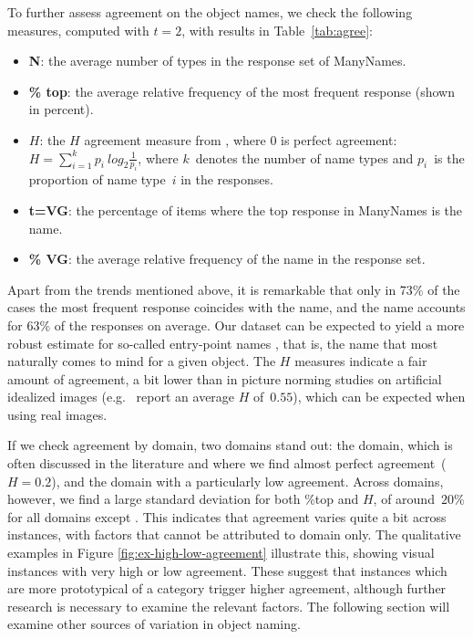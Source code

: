 To further assess agreement on the object names, we check the following measures, computed with $t=2$, with results in Table~\ref{tab:agree}:
\begin{itemize}
\item \textbf{N}: the average number of types in the response set of ManyNames.
\item \textbf{\% top}: the average relative frequency of the most frequent response (shown in percent).
\item \textbf{$H$}: the $H$ agreement measure from \cite{snodgrass}, where 0 is perfect agreement: \mbox{$H = \sum_{i=1}^k p_i~log_2\frac{1}{p_i}$}, 
where $k$\ denotes the number of name types and $p_i$\ is the proportion of name type\ $i$ in the responses. 
\item \textbf{t=VG}: the percentage of items where the top response in ManyNames is the \vg name.
\item \textbf{\% VG}: the average relative frequency of the \vg name in the response set.
\end{itemize}

Apart from the trends mentioned above, it is remarkable that only in 73\% of the cases the most frequent response coincides with the \vg name, and the \vg name accounts for 63\% of the responses on average.
Our dataset can be expected to yield a more robust estimate for so-called entry-point names \cite{jolicoeur1984pictures}, that is, the name that most naturally comes to mind for a given object.
The $H$ measures indicate a fair amount of agreement, a bit lower than in picture norming studies on artificial idealized images (e.g.\  report an average $H$ of\ $0.55$), which can be expected when using real images.

If we check agreement by domain, two domains stand out: the  domain, which is often discussed in the literature and where we find almost perfect agreement\ (\mbox{$H=0.2$}), and the  domain with a particularly low agreement.
Across domains, however, we find a large standard deviation for both \%top and $H$, of around\ $20\%$ for all domains except .
This indicates that agreement varies quite a bit across instances, with factors that cannot be attributed to domain only.
The qualitative examples in Figure \ref{fig:ex-high-low-agreement} illustrate this, showing visual instances with very high or low agreement.
These suggest that instances which are more prototypical of a category trigger higher agreement, although further research is necessary to examine the relevant factors.
The following section will examine other sources of variation in object naming.

